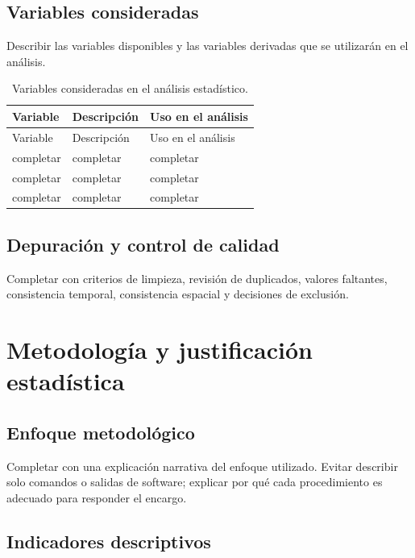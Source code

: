 \documentclass[
  spanish,
  letterpaper,
  DIV=11,
  numbers=noendperiod]{scrartcl}
\begin{document}
\subsection{Variables consideradas}\label{variables-consideradas}

Describir las variables disponibles y las variables derivadas que se
utilizarán en el análisis.

\begin{longtable}[]{@{}lll@{}}
\caption{Variables consideradas en el análisis
estadístico.}\label{tbl-variables}\tabularnewline
\toprule\noalign{}
Variable & Descripción & Uso en el análisis \\
\midrule\noalign{}
\endfirsthead
\toprule\noalign{}
Variable & Descripción & Uso en el análisis \\
\midrule\noalign{}
\endhead
\bottomrule\noalign{}
\endlastfoot
completar & completar & completar \\
completar & completar & completar \\
completar & completar & completar \\
\end{longtable}

\subsection{Depuración y control de
calidad}\label{depuraciuxf3n-y-control-de-calidad}

Completar con criterios de limpieza, revisión de duplicados, valores
faltantes, consistencia temporal, consistencia espacial y decisiones de
exclusión.

\section{Metodología y justificación
estadística}\label{metodologuxeda-y-justificaciuxf3n-estaduxedstica}

\subsection{Enfoque metodológico}\label{enfoque-metodoluxf3gico}

Completar con una explicación narrativa del enfoque utilizado. Evitar
describir solo comandos o salidas de software; explicar por qué cada
procedimiento es adecuado para responder el encargo.

\subsection{Indicadores descriptivos}\label{indicadores-descriptivos}
\end{document}
